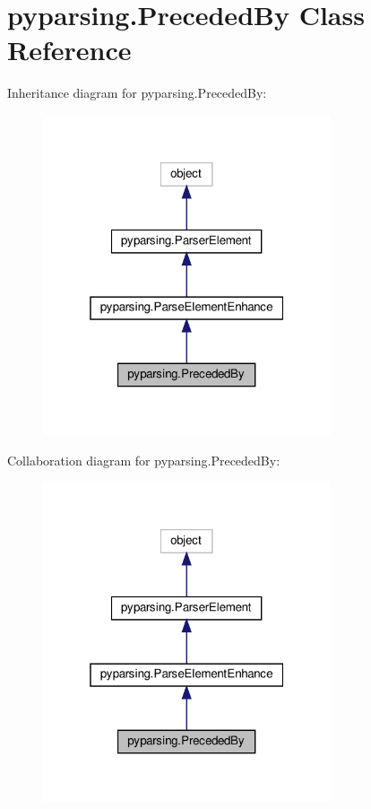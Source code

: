 \hypertarget{classpyparsing_1_1PrecededBy}{}\section{pyparsing.\+Preceded\+By Class Reference}
\label{classpyparsing_1_1PrecededBy}


Inheritance diagram for pyparsing.\+Preceded\+By\+:
\nopagebreak
\begin{figure}[H]
\begin{center}
\leavevmode
\includegraphics[width=241pt]{classpyparsing_1_1PrecededBy__inherit__graph}
\end{center}
\end{figure}


Collaboration diagram for pyparsing.\+Preceded\+By\+:
\nopagebreak
\begin{figure}[H]
\begin{center}
\leavevmode
\includegraphics[width=241pt]{classpyparsing_1_1PrecededBy__coll__graph}
\end{center}
\end{figure}

